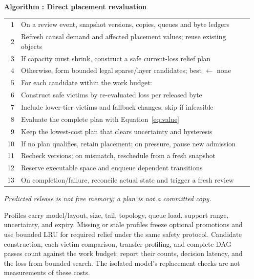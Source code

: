 \par\medskip\noindent\begin{minipage}{\columnwidth}
\raggedright
 \label{alg:placement}
 \textbf{Algorithm \thedesignalgorithm: Direct placement revaluation}
 \par\smallskip
 \begin{tabularx}{\columnwidth}{@{}r@{\quad}X@{}}
 \toprule
 1 & On a review event, snapshot versions, copies, queues and byte ledgers \\
 2 & Refresh causal demand and affected placement values; reuse existing objects \\
 3 & If capacity must shrink, construct a safe current-loss relief plan \\
 4 & Otherwise, form bounded legal sparse/layer candidates; best $\leftarrow$ none \\
 5 & For each candidate within the work budget: \\
 6 & \quad Construct safe victims by re-evaluated loss per released byte \\
 7 & \quad Include lower-tier victims and fallback changes; skip if infeasible \\
 8 & \quad Evaluate the complete plan with Equation~\ref{eq:value} \\
 9 & \quad Keep the lowest-cost plan that clears uncertainty and hysteresis \\
 10 & If no plan qualifies, retain placement; on pressure, pause new admission \\
 11 & Recheck versions; on mismatch, reschedule from a fresh snapshot \\
 12 & Reserve executable space and enqueue dependent transitions \\
 13 & On completion/failure, reconcile actual state and trigger a fresh review \\
 \bottomrule
 \end{tabularx}
 \par\smallskip\noindent\textit{Predicted release is not free memory; a plan is not a committed copy.}
 \end{minipage}\par\medskip

Profiles carry model/layout, size, tail, topology, queue load, support
range, uncertainty, and expiry. Missing or stale profiles freeze optional
promotions and use bounded LRU for required relief under the same safety
protocol. Candidate construction, each victim comparison, transfer
profiling, and complete DAG passes count against the work budget; report
their counts, decision latency, and the loss from bounded search. The
isolated model's replacement checks are not measurements of these costs.

